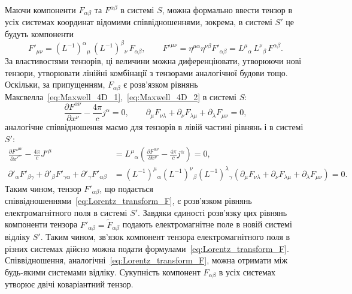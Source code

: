 Маючи компоненти $F_{\alpha\beta}$ та $F^{\alpha\beta}$ в системі $S$, можна формально ввести тензор в усіх системах
координат відомими співвідношеннями, зокрема, в системі $S'$ це будуть компоненти
\begin{equation}\label{eq:Lorentz_transform_F}
    F'_{\mu\nu} = (L^{-1})^{\alpha}{}_{\mu}\,(L^{-1})^{\beta}{}_{\nu}\,F_{\alpha\beta},
    \qquad
    F'^{\mu\nu} = \eta^{\mu\alpha}\eta^{\nu\beta}F'_{\alpha\beta}
    = L^{\mu}{}_{\alpha}\,L^{\nu}{}_{\beta}\,F^{\alpha\beta}.
\end{equation}
За властивостями тензорів, ці величини можна диференціювати, утворюючи нові тензори, утворювати лінійні комбінації з
тензорами аналогічної будови тощо. Оскільки, за припущенням, $F_{\alpha\beta}$ є розв'язком рівнянь
Максвелла~\eqref{eq:Maxwell_4D_1},~\eqref{eq:Maxwell_4D_2} в системі $S$:
\begin{equation*}
    \frac{\partial F^{\alpha\nu}}{\partial x^{\nu}} - \frac{4\pi}{c}j^{\alpha} = 0,
    \qquad
    \partial_{\mu}F_{\nu\lambda} + \partial_{\nu}F_{\lambda\mu}
    + \partial_{\lambda}F_{\mu\nu} = 0,
\end{equation*}
аналогічне співвідношення маємо для тензорів в лівій частині рівнянь і в системі $S'$:
\begin{align*}
    \frac{\partial F'^{\mu\nu}}{\partial x'^{\nu}} - \frac{4\pi}{c}J'^{\mu}
     & = L^{\mu}{}_{\alpha}\!\left(\frac{\partial F^{\alpha\nu}}{\partial x^{\nu}}
    - \frac{4\pi}{c}j^{\alpha}\right) = 0,                                              \\
    \partial'_{\alpha}F'_{\beta\gamma} + \partial'_{\beta}F'_{\gamma\alpha}
    + \partial'_{\gamma}F'_{\alpha\beta}
     & = (L^{-1})^{\mu}{}_{\alpha}(L^{-1})^{\nu}{}_{\beta}(L^{-1})^{\lambda}{}_{\gamma}
    \!\left(\partial_{\mu}F_{\nu\lambda} + \partial_{\nu}F_{\lambda\mu}
    + \partial_{\lambda}F_{\mu\nu}\right) = 0.
\end{align*}
Таким чином, тензор $F'_{\alpha\beta}$, що подається співвідношеннями~\eqref{eq:Lorentz_transform_F}, є розв'язком
рівнянь електромагнітного поля в системі $S'$. Завдяки єдиності розв'язку цих рівнянь компоненти тензора
$F'_{\alpha\beta} = \tilde{F}_{\alpha\beta}$ подають електромагнітне поле в новій системі відліку $S'$. Таким чином,
зв'язок компонент тензора електромагнітного поля в різних системах дійсно можна подати
формулами~\eqref{eq:Lorentz_transform_F}. Співвідношення, аналогічні~\eqref{eq:Lorentz_transform_F}, можна отримати між
будь-якими системами відліку. Сукупність компонент $F_{\alpha\beta}$ в усіх системах утворює двічі коваріантний тензор.

